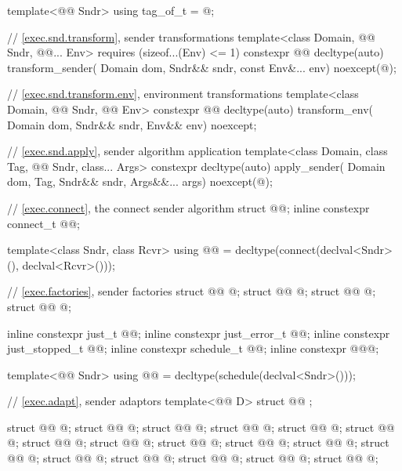 \begin{codeblock}
{  template<@@ Sndr>
    using tag_of_t = @\seebelow@;

  // \ref{exec.snd.transform}, sender transformations
  template<class Domain, @@ Sndr, @@... Env>
      requires (sizeof...(Env) <= 1)
    constexpr @@ decltype(auto) transform_sender(
      Domain dom, Sndr&& sndr, const Env&... env) noexcept(@\seebelow@);

  // \ref{exec.snd.transform.env}, environment transformations
  template<class Domain, @@ Sndr, @@ Env>
    constexpr @@ decltype(auto) transform_env(
      Domain dom, Sndr&& sndr, Env&& env) noexcept;

  // \ref{exec.snd.apply}, sender algorithm application
  template<class Domain, class Tag, @@ Sndr, class... Args>
    constexpr decltype(auto) apply_sender(
      Domain dom, Tag, Sndr&& sndr, Args&&... args) noexcept(@\seebelow@);

  // \ref{exec.connect}, the connect sender algorithm
  struct @@;
  inline constexpr connect_t @@{};

  template<class Sndr, class Rcvr>
    using @@ =
      decltype(connect(declval<Sndr>(), declval<Rcvr>()));

  // \ref{exec.factories}, sender factories
  struct @@ { @\unspec@ };
  struct @@ { @\unspec@ };
  struct @@ { @\unspec@ };
  struct @@ { @\unspec@ };

  inline constexpr just_t @@{};
  inline constexpr just_error_t @@{};
  inline constexpr just_stopped_t @@{};
  inline constexpr schedule_t @@{};
  inline constexpr @\unspec@ @@{};

  template<@@ Sndr>
    using @@ = decltype(schedule(declval<Sndr>()));

  // \ref{exec.adapt}, sender adaptors
  template<@@ D>
    struct @@ { };

  struct @@ { @\unspec@ };
  struct @@ { @\unspec@ };
  struct @@ { @\unspec@ };
  struct @@ { @\unspec@ };
  struct @@ { @\unspec@ };
  struct @@ { @\unspec@ };
  struct @@ { @\unspec@ };
  struct @@ { @\unspec@ };
  struct @@ { @\unspec@ };
  struct @@ { @\unspec@ };
  struct @@ { @\unspec@ };
  struct @@ { @\unspec@ };
  struct @@ { @\unspec@ };
  struct @@ { @\unspec@ };
  struct @@ { @\unspec@ };
  struct @@ { @\unspec@ };
  struct @@ { @\unspec@ };

}
\end{codeblock}
